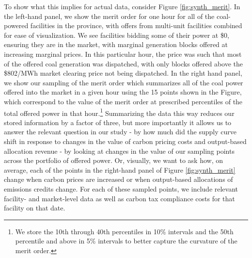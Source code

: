 \documentclass[12pt]{article}
\begin{document}
To show what this implies for actual data, consider Figure \ref{fig:synth_merit}. In the left-hand panel, we show the merit order for one hour for all of the coal-powered facilities in the province, with offers from multi-unit facilities combined for ease of visualization. We see facilities bidding some of their power at \$0, ensuring they are in the market, with marginal generation blocks offered at increasing marginal prices. In this particular hour, the price was such that most of the offered coal generation was dispatched, with only blocks offered above the \$802/MWh market clearing price not being dispatched. In the right hand panel, we show our sampling of the merit order which summarizes all of the coal power offered into the market in a given hour using the 15 points shown in the Figure, which correspond to the value of the merit order at prescribed percentiles of the total offered power in that hour.\footnote{We store the 10th through 40th percentiles in 10\% intervals and the 50th percentile and above in 5\% intervals to better capture the curvature of the merit order.} Summarizing the data this way reduces our stored information by a factor of three, but more importantly it allows us to answer the relevant question in our study - by how much did the supply curve shift in response to changes in the value of carbon pricing costs and output-based allocation revenue - by looking at changes in the value of our sampling points across the portfolio of offered power. Or, visually, we want to ask how, on average, each of the points in the right-hand panel of Figure \ref{fig:synth_merit} change when carbon prices are increased or when output-based allocations of emissions credits change. For each of these sampled points, we include relevant facility- and market-level data as well as carbon tax compliance costs for that facility on that date.
\end{document}
